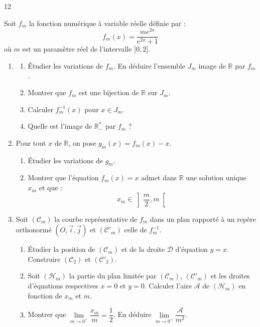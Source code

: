 \documentclass{axiobac}
\begin{document}
\begin{probleme}{12}

Soit $f_m$ la fonction numérique à variable réelle définie par :
\[ f_m(x) = \frac{m e^{2x}}{e^{2x} + 1} \]
où $m$ est un paramètre réel de l'intervalle $]0, 2]$.

\begin{enumerate}
    \item 
    \begin{enumerate}
        \item Étudier les variations de $f_m$. En déduire l'ensemble $J_m$ image de $\mathbb{R}$ par $f_m$.
        \item Montrer que $f_m$ est une bijection de $\mathbb{R}$ sur $J_m$.
        \item Calculer $f_m^{-1}(x)$ pour $x \in J_m$.
        \item Quelle est l'image de $\mathbb{R}^*_-$ par $f_m$ ?
    \end{enumerate}

    \item Pour tout $x$ de $\mathbb{R}$, on pose $g_m(x) = f_m(x) - x$.
    \begin{enumerate}
        \item Étudier les variations de $g_m$.
        \item Montrer que l'équation $f_m(x) = x$ admet dans $\mathbb{R}$ une solution unique $x_m$ et que :
        \[ x_m \in \left] \frac{m}{2}, m \right[ \]
    \end{enumerate}

    \item Soit $(\mathcal{C}_m)$ la courbe représentative de $f_m$ dans un plan rapporté à un repère orthonormé $(O, \vec{i}, \vec{j})$ et $(\mathcal{C}'_m)$ celle de $f_m^{-1}$.
    \begin{enumerate}
        \item Étudier la position de $(\mathcal{C}_m)$ et de la droite $\mathcal{D}$ d'équation $y=x$. Construire $(\mathcal{C}_2)$ et $(\mathcal{C'}_2)$.
        \item Soit $(\mathcal{H}_m)$ la partie du plan limitée par $(\mathcal{C}_m)$, $(\mathcal{C}'_m)$ et les droites d'équations respectives $x=0$ et $y=0$. Calculer l'aire $\mathcal{A}$ de $(\mathcal{H}_m)$ en fonction de $x_m$ et $m$.
        \item Montrer que $\lim\limits_{m \to 0^+} \dfrac{x_m}{m} = \dfrac{1}{2}$. En déduire $\lim\limits_{m \to 0^+} \dfrac{\mathcal{A}}{m^2}$.
    \end{enumerate}
\end{enumerate}


\end{probleme}
\end{document}
